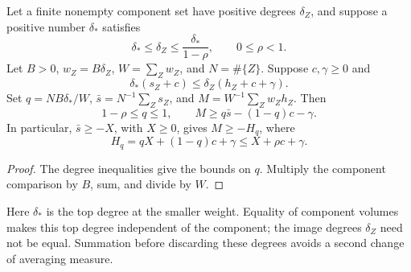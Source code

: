 \begin{lemma}
\label{geometric-volume-weights}
Let a finite nonempty component set have positive degrees $\delta_Z$,
and suppose a positive number $\delta_*$ satisfies
\[
 \delta_*\le\delta_Z\le\frac{\delta_*}{1-\rho},
 \qquad 0\le\rho<1.
\]
Let $B>0$, $w_Z=B\delta_Z$, $W=\sum_Zw_Z$, and $N=\#\{Z\}$.
Suppose $c,\gamma\ge0$ and
\[
 \delta_*(s_Z+c)\le\delta_Z(h_Z+c+\gamma).
\]
Set $q=NB\delta_*/W$, $\bar s=N^{-1}\sum_Zs_Z$, and
$M=W^{-1}\sum_Zw_Zh_Z$. Then
\begin{equation}\label{eq:geometric-volume-weights}
 1-\rho\le q\le1,\qquad
 M\ge q\bar s-(1-q)c-\gamma.
\end{equation}
In particular, $\bar s\ge-X$, with $X\ge0$, gives
$M\ge-H_q$, where
\[
 H_q=qX+(1-q)c+\gamma\le X+\rho c+\gamma.
\]
\end{lemma}
\begin{proof}
The degree inequalities give the bounds on $q$. Multiply the component
comparison by $B$, sum, and divide by $W$.
\end{proof}

Here $\delta_*$ is the top degree at the smaller weight. Equality of
component volumes makes this top degree independent of the component;
the image degrees $\delta_Z$ need not be equal. Summation before
discarding these degrees avoids a second change of averaging measure.

